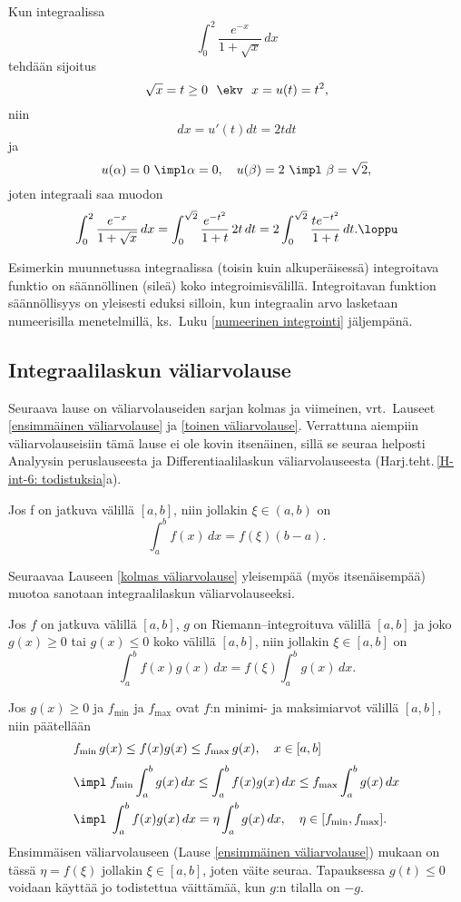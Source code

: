 \begin{Exa}
Kun integraalissa
\[
\int_0^2 \frac{e^{-x}}{1+\sqrt{x}}\, dx
\]
tehdään sijoitus
\[
\sqrt{x}=t \ge 0\ \ \ekv\ \ x=u(t)=t^2,
\]
niin
\[
dx=u'(t)dt=2tdt
\]
ja
\[
u(\alpha)=0\ \impl \alpha=0, \quad u(\beta)=2\ \impl\ \beta=\sqrt{2},
\]
joten integraali saa muodon
\[
\int_0^2 \frac{e^{-x}}{1+\sqrt{x}}\, dx=\int_0^{\sqrt{2}} \frac{e^{-t^2}}{1+t}\,2t\,dt
                                       =2\int_0^{\sqrt{2}} \frac{te^{-t^2}}{1+t}\,dt. \loppu
\]
\end{Exa}
Esimerkin muunnetussa integraalissa (toisin kuin alkuperäisessä) integroitava funktio on 
säännöllinen (sileä) koko integroimisvälillä. Integroitavan funktion säännöllisyys on yleisesti
eduksi silloin, kun integraalin arvo lasketaan numeerisilla menetelmillä, ks.\ Luku 
\ref{numeerinen integrointi} jäljempänä.

\subsection*{Integraalilaskun väliarvolause}

Seuraava lause on väliarvolauseiden sarjan kolmas ja viimeinen, vrt.\ Lauseet 
\ref{ensimmäinen väliarvolause} ja \ref{toinen väliarvolause}. Verrattuna aiempiin
väliarvolauseisiin tämä lause ei ole kovin itsenäinen, sillä se seuraa helposti Analyysin
peruslauseesta ja Differentiaalilaskun väliarvolauseesta
(Harj.teht.\,\ref{H-int-6: todistuksia}a).
\begin{Lause} \label{kolmas väliarvolause} 
 
Jos f on jatkuva välillä $[a,b]$, niin jollakin $\xi\in(a,b)$ on
\[
\int_a^b f(x)\,dx = f(\xi)(b-a).
\]
\end{Lause}
Seuraavaa Lauseen \ref{kolmas väliarvolause} yleisempää (myös itsenäisempää) muotoa sanotaan
integraalilaskun  väliarvolauseeksi.
\begin{Lause} \label{kolmas väliarvolause - yleistys}
Jos $f$ on jatkuva välillä $[a,b]$, $g$ on Riemann--integroituva välillä $[a,b]$ ja joko
$g(x) \ge 0$ tai $g(x) \le 0$ koko välillä $[a,b]$, niin jollakin $\xi \in[a,b]$ on
\[
\int_a^b f(x)g(x)\,dx=f(\xi)\int_a^b g(x)\,dx.
\]
\end{Lause}
\tod Jos $g(x)\geq 0$ ja $f_{\text{min}}$ ja $f_{\text{max}}$ ovat $f$:n minimi- ja maksimiarvot
välillä $[a,b]$, niin päätellään
\begin{align*}
&f_{\text{min}}\,g(x) \le f(x)g(x) \le f_{\text{max}}\,g(x),\quad x\in [a,b] \\[1mm]
&\impl\; f_{\text{min}} \int_a^b g(x)\,dx \le \int_a^b f(x)g(x)\,dx 
                                  \le f_{\text{max}} \int_a^b g(x)\,dx \\
&\impl\; \int_a^b f(x)g(x)\,dx = \eta \int_a^b g(x)\,dx, \quad 
                                    \eta\in [f_{\text{min}},f_{\text{max}}]. 
\end{align*}
Ensimmäisen väliarvolauseen (Lause \ref{ensimmäinen väliarvolause}) mukaan on tässä 
$\eta=f(\xi)$ jollakin $\xi\in [a,b]$, joten väite seuraa. Tapauksessa $g(t)\leq 0$ voidaan
käyttää jo todistettua väittämää, kun $g$:n tilalla on $-g$. \loppu

